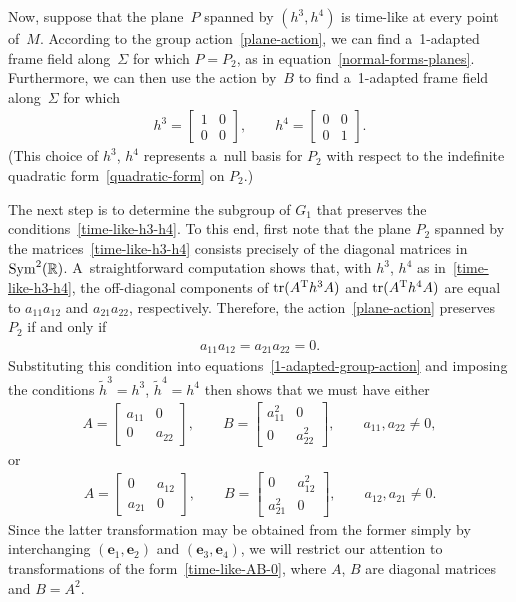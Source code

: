 \documentclass[10pt,a4paper]{amsart}
\numberwithin{equation}{section}
\theoremstyle{definition}
\DeclareMathOperator{\tr}{tr}
\begin{document}
Now, suppose that the plane~$P$ spanned by $(h^3, h^4)$ is time-like at every point of~$M$.
According to the group action~\eqref{plane-action}, we can f\/ind a~1-adapted frame f\/ield along~$\Sigma$ for which
$P=P_2$, as in equation~\eqref{normal-forms-planes}.
Furthermore, we can then use the action by~$B$ to f\/ind a~1-adapted frame f\/ield along~$\Sigma$ for which
\begin{gather}
\label{time-like-h3-h4}
h^3 =
\begin{bmatrix}
1 & 0
\\
0 & 0
\end{bmatrix},
\qquad
h^4 =
\begin{bmatrix}
0 & 0
\\
0 & 1
\end{bmatrix}.
\end{gather}
(This choice of $h^3$, $h^4$ represents a~null basis for $P_2$ with respect to the indef\/inite quadratic
form~\eqref{quadratic-form} on $P_2$.)

The next step is to determine the subgroup of $G_1$ that preserves the conditions~\eqref{time-like-h3-h4}.
To this end, f\/irst note that the plane $P_2$ spanned by the matrices~\eqref{time-like-h3-h4} consists precisely of the
diagonal matrices in ${\rm Sym}^2(\mathbb{R})$.
A~straightforward computation shows that, with $h^3$, $h^4$ as in~\eqref{time-like-h3-h4}, the of\/f-diagonal components of
$\tr(A^{\rm T} h^3 A)$ and $\tr(A^{\rm T} h^4 A)$ are equal to $a_{11}a_{12}$ and $a_{21}a_{22}$, respectively.
Therefore, the action~\eqref{plane-action} preserves $P_2$ if and only if
\begin{gather*}
a_{11}a_{12} = a_{21}a_{22} = 0.
\end{gather*}
Substituting this condition into equations~\eqref{1-adapted-group-action} and imposing the conditions $\tilde{h}^3 =
h^3$, $\tilde{h}^4 = h^4$ then shows that we must have either
\begin{gather}
A=
\begin{bmatrix}
a_{11} & 0
\\
0 & a_{22}
\end{bmatrix},
\qquad
B =
\begin{bmatrix}
a_{11}^2 & 0
\\
0 & a_{22}^2
\end{bmatrix},
\qquad
a_{11}, a_{22} \neq 0,
\label{time-like-AB-0}
\end{gather}
or
\begin{gather*}
A =
\begin{bmatrix}
0 & a_{12}
\\
a_{21} & 0
\end{bmatrix},
\qquad
B =
\begin{bmatrix}
0 & a_{12}^2
\\
a_{21}^2 & 0
\end{bmatrix},
\qquad
a_{12}, a_{21} \neq 0.
\end{gather*}
Since the latter transformation may be obtained from the former simply by interchanging $(\mathbf{e}_1, \mathbf{e}_2)$
and $(\mathbf{e}_3, \mathbf{e}_4)$, we will restrict our attention to transformations of the form~\eqref{time-like-AB-0},
where $A$, $B$ are diagonal matrices and $B = A^2$.
\end{document}
